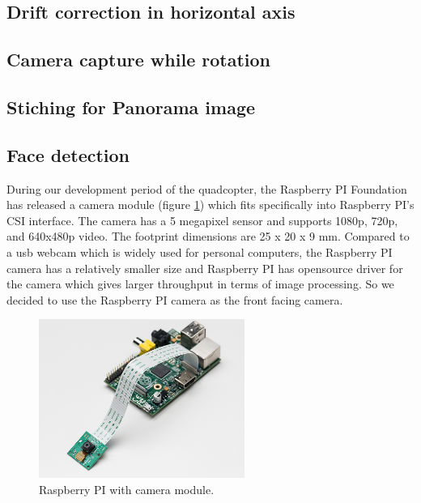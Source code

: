 \documentclass[11pt, a4paper, onecolumn, oneside, parskip=half]{scrartcl}
\begin{document}
\subsection{Drift correction in horizontal axis}
\label{sec:objectives:drift}

\subsection{Camera capture while rotation}
\label{sec:objectives:cameraCaptureRotate}

\subsection{Stiching for Panorama image}
\label{sec:objectives:stitching}

\subsection{Face detection}
\label{sec:objectives:face}
During our development period of the quadcopter, the Raspberry PI Foundation has released a camera module (figure \ref{fig:raspicamera}) which fits specifically into Raspberry PI's CSI interface. The camera has a 5 megapixel sensor and supports 1080p, 720p, and 640x480p video. The footprint dimensions are 25 x 20 x 9 mm. Compared to a usb webcam which is widely used for personal computers, the Raspberry PI camera has a relatively smaller size and Raspberry PI has opensource driver for the camera which gives larger throughput in terms of image processing. So we decided to use the Raspberry PI camera as the front facing camera.

\begin{figure}[ht]
\centering
\includegraphics[width=0.6\textwidth]{image03}
\caption{Raspberry PI with camera module.}
\label{fig:raspicamera}
\end{figure}
\end{document}
